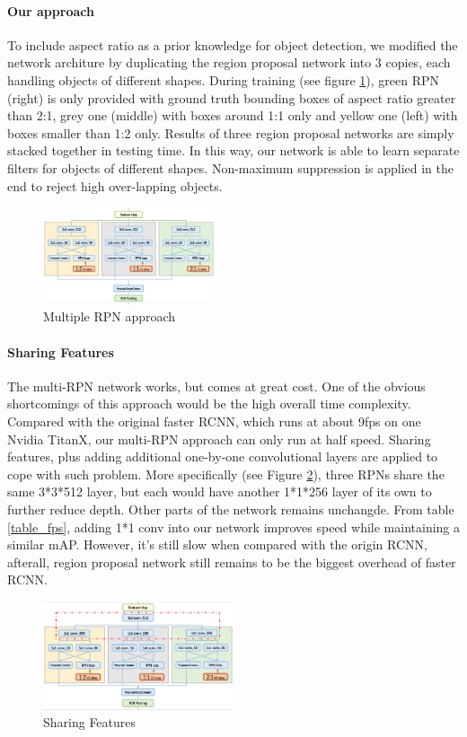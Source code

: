 \documentclass[10pt,twocolumn,letterpaper]{article}
\begin{document}
\paragraph{Our approach}
To include aspect ratio as a prior knowledge for object detection, we modified the network architure by duplicating the region proposal network into 3 copies, each handling objects of different shapes. During training (see figure \ref{ARS_De}), green RPN (right) is only provided with ground truth bounding boxes of aspect ratio greater than 2:1, grey one (middle) with boxes around 1:1 only and yellow one (left) with boxes smaller than 1:2 only. Results of three region proposal networks are simply stacked together in testing time. In this way, our network is able to learn separate filters for objects of different shapes. Non-maximum suppression is applied in the end to reject high over-lapping objects. 
    \begin{figure}[!htb]
    \includegraphics[width= 0.45\textwidth]{pic/ARS-archi-detail.png}
    \caption{Multiple RPN approach}
    \label{ARS_De}
    \end{figure}


\paragraph{Sharing Features}
The multi-RPN network works, but comes at great cost. One of the obvious shortcomings of this approach would be the high overall time complexity. Compared with the original faster RCNN, which runs at about 9fps on one Nvidia TitanX, our multi-RPN approach can only run at half speed. Sharing features, plus adding additional one-by-one convolutional layers are applied to cope with such problem. More specifically (see Figure \ref{ARS_sh}), three RPNs share the same 3*3*512 layer, but each would have another 1*1*256 layer of its own to further reduce depth. Other parts of the network remains unchangde. From table \ref{table_fps}, adding 1*1 conv into our network improves speed while maintaining a similar mAP. However, it's still slow when compared with the origin RCNN, afterall, region proposal network still remains to be the biggest overhead of faster RCNN.
    \begin{figure}[!htb]
    \includegraphics[width= 0.5\textwidth]{pic/ARS-archi-share.png}
    \caption{Sharing Features}
    \label{ARS_sh}
    \end{figure}
\end{document}
